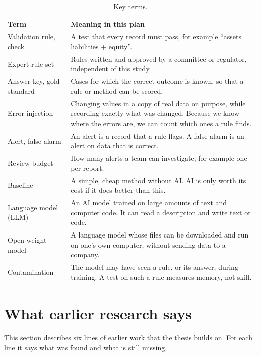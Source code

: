 \documentclass[11pt,a4paper]{article}
\begin{document}
\begin{table}[htbp]
\centering
\small
\begin{tabularx}{\textwidth}{@{}p{3.3cm}L@{}}
\toprule
Term & Meaning in this plan \\
\midrule
Validation rule, check & A test that every record must pass, for example ``assets = liabilities + equity''. \\
Expert rule set & Rules written and approved by a committee or regulator, independent of this study. \\
Answer key, gold standard & Cases for which the correct outcome is known, so that a rule or method can be scored. \\
Error injection & Changing values in a copy of real data on purpose, while recording exactly what was changed. Because we know where the errors are, we can count which ones a rule finds. \\
Alert, false alarm & An alert is a record that a rule flags. A false alarm is an alert on data that is correct. \\
Review budget & How many alerts a team can investigate, for example one per report. \\
Baseline & A simple, cheap method without AI. AI is only worth its cost if it does better than this. \\
Language model (LLM) & An AI model trained on large amounts of text and computer code. It can read a description and write text or code. \\
Open-weight model & A language model whose files can be downloaded and run on one's own computer, without sending data to a company. \\
Contamination & The model may have seen a rule, or its answer, during training. A test on such a rule measures memory, not skill. \\
\bottomrule
\end{tabularx}
\caption{Key terms.}
\label{tab:terms}
\end{table}

\section{What earlier research says}
\label{sec:lit}

This section describes six lines of earlier work that the thesis builds on. For each line it says what was found and what is still missing.
\end{document}

